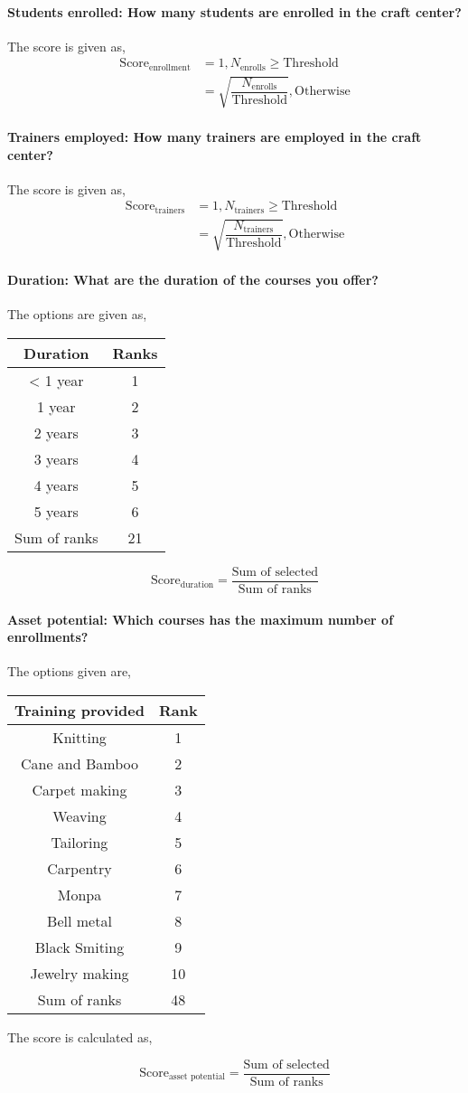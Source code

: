 \documentclass[oneside,twocolumn]{article}
\newcommand{\tsub}[2]{\text{#1}_{\text{#2}}}
\newcommand{\tsubb}[2]{#1_{\text{#2}}}
\newcommand{\dsub}[2]{\dfrac{\text{#1}}{\text{#2}}}
\newcommand{\multsel}[1]
{
	\[
		\tsub{Score}{#1} = \dsub{Sum of selected}{Sum of ranks}
	\]
}
\newenvironment{ttable}
{
\begin{center}
\begin{tabular}{c|c}
\hline
}
{
\\ \hline
\end{tabular}
\end{center}
}
\begin{document}
\paragraph{Students enrolled: How many students are enrolled in the craft center?}
The score is given as,
\begin{align*}
	\tsub{Score}{enrollment} &= 1, \tsubb{N}{enrolls} \ge \text{Threshold} \\
	&= \sqrt{\dfrac{\tsubb{N}{enrolls}}{\text{Threshold}}}, \text{Otherwise}
\end{align*}
\paragraph{Trainers employed: How many trainers are employed in the craft center?}
The score is given as,
\begin{align*}
	\tsub{Score}{trainers} &= 1, \tsubb{N}{trainers} \ge \text{Threshold} \\
	&= \sqrt{\dfrac{\tsubb{N}{trainers}}{\text{Threshold}}}, \text{Otherwise}
\end{align*}
\paragraph{Duration: What are the duration of the courses you offer?}
The options are given as,
\begin{ttable}
	Duration & Ranks \\ \hline
	< 1 year & 1 \\
	1 year & 2 \\
	2 years & 3 \\
	3 years & 4 \\
	4 years & 5 \\
	5 years & 6 \\ \hline
	Sum of ranks & 21
\end{ttable}
\multsel{duration}

\paragraph{Asset potential: Which courses has the maximum number of enrollments?}
The options given are,
\begin{ttable}
	Training provided & Rank \\ \hline
	Knitting & 1 \\
	Cane and Bamboo & 2 \\
	Carpet making & 3 \\
	Weaving & 4 \\
	Tailoring & 5 \\
	Carpentry & 6 \\
	Monpa & 7 \\
	Bell metal & 8 \\
	Black Smiting & 9 \\
	Jewelry making & 10 \\ \hline
	Sum of ranks & 48 
\end{ttable}
The score is calculated as,
\multsel{asset potential}
\end{document}
